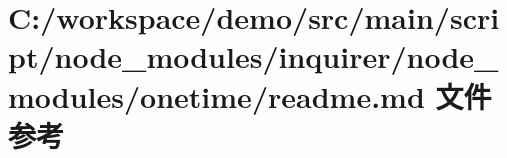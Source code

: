 \hypertarget{node__modules_2inquirer_2node__modules_2onetime_2_r_e_a_d_m_e_8md}{}\section{C\+:/workspace/demo/src/main/script/node\+\_\+modules/inquirer/node\+\_\+modules/onetime/readme.md 文件参考}
\label{node__modules_2inquirer_2node__modules_2onetime_2_r_e_a_d_m_e_8md}
